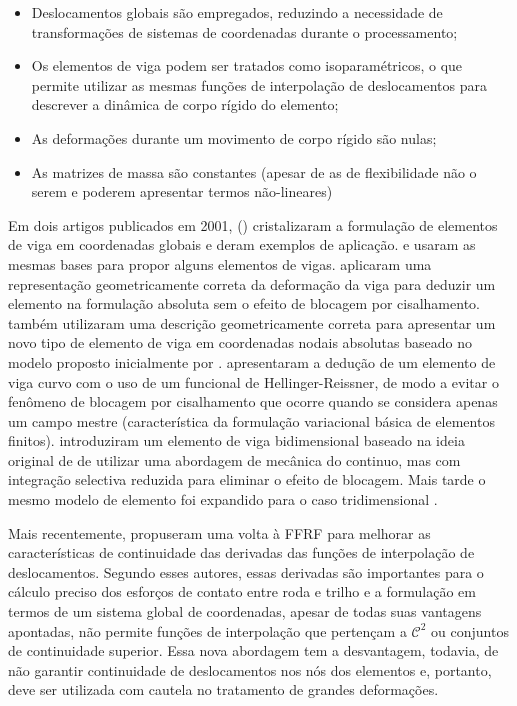 \begin{itemize}
 \item Deslocamentos globais são empregados, reduzindo a necessidade de transformações de sistemas de coordenadas durante o processamento;
 \item Os elementos de viga podem ser tratados como isoparamétricos, o que permite utilizar as mesmas funções de interpolação de deslocamentos para descrever a dinâmica de corpo rígido do elemento;
 \item As deformações durante um movimento de corpo rígido são nulas;
 \item As matrizes de massa são constantes (apesar de as de flexibilidade não o serem e poderem apresentar termos não-lineares)
\end{itemize}

Em dois artigos publicados em 2001, \citeauthor{shabana_three_2001} (\citeyear{shabana_three_2001,shabana_three_2001-1}) cristalizaram a formulação de elementos de viga em coordenadas globais e deram exemplos de aplicação.  e  usaram as mesmas bases para propor alguns elementos de vigas.  aplicaram uma representação geometricamente correta da deformação da viga \cite{geradin_flexible_2001} para deduzir um elemento na formulação absoluta sem o efeito de blocagem por cisalhamento.  também utilizaram uma descrição geometricamente correta para apresentar um novo tipo de elemento de viga em coordenadas nodais absolutas baseado no modelo proposto inicialmente por .  apresentaram a dedução de um elemento de viga curvo com o uso de um funcional de Hellinger-Reissner, de modo a evitar o fenômeno de blocagem por cisalhamento que ocorre quando se considera apenas um campo mestre (característica da formulação variacional básica de elementos finitos).  introduziram um elemento de viga bidimensional baseado na ideia original de \citeauthor{shabana_three_2001} de utilizar uma abordagem de mecânica do continuo, mas com integração selectiva reduzida para eliminar o efeito de blocagem. Mais tarde o mesmo modelo de elemento foi expandido para o caso tridimensional \cite{nachbagauer_structural_2013}.

Mais recentemente,  propuseram uma volta à FFRF para melhorar as características de continuidade das derivadas das funções de interpolação de deslocamentos. Segundo esses autores, essas derivadas são importantes para o cálculo preciso dos esforços de contato entre roda e trilho e a formulação em termos de um sistema global de coordenadas, apesar de todas suas vantagens apontadas, não permite funções de interpolação que pertençam a $\mathcal{C}^2$ ou conjuntos de continuidade superior. Essa nova abordagem tem a desvantagem, todavia, de não garantir continuidade  de deslocamentos nos nós dos elementos e, portanto, deve ser utilizada com cautela no tratamento de grandes deformações.

